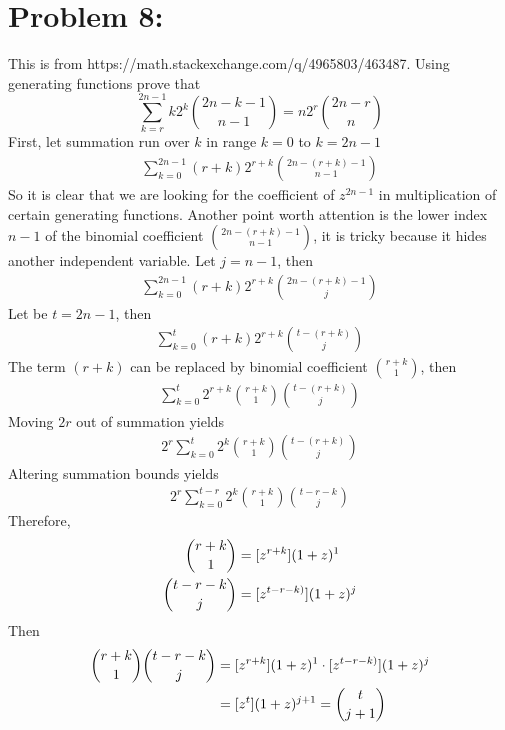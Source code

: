﻿\section{Problem 8: }
\label{sec:problem-8}
This is from https://math.stackexchange.com/q/4965803/463487.
Using generating functions prove that
\begin{equation*}
    \sum_{k=r}^{2n-1} k2^k \binom{2n-k-1}{n-1} = n2^r \binom{2n-r}{n}
\end{equation*}
First, let summation run over $k$ in range $k=0$ to $k=2n-1$
\begin{align*}
    \sum_{k=0}^{2n-1} (r+k) 2^{r+k} \binom{2n-(r+k)-1}{n-1}
\end{align*}
So it is clear that we are looking for the coefficient of $z^{2n-1}$ in multiplication of certain generating functions.
Another point worth attention is the lower index $n-1$ of the binomial coefficient $\binom{2n-(r+k)-1}{n-1}$,
it is tricky because it hides another independent variable.
Let $j=n-1$, then
\begin{align*}
    \sum_{k=0}^{2n-1} (r+k) 2^{r+k} \binom{2n-(r+k)-1}{j}
\end{align*}
Let be $t=2n-1$, then
\begin{align*}
    \sum_{k=0}^{t} (r+k) 2^{r+k} \binom{t-(r+k)}{j}
\end{align*}
The term $(r+k)$ can be replaced by binomial coefficient $\binom{r+k}{1}$, then
\begin{align*}
    \sum_{k=0}^{t} 2^{r+k} \binom{r+k}{1} \binom{t-(r+k)}{j}
\end{align*}
Moving $2r$ out of summation yields
\begin{align*}
    2^r \sum_{k=0}^{t} 2^{k} \binom{r+k}{1} \binom{t-(r+k)}{j}
\end{align*}
Altering summation bounds yields
\begin{align*}
    2^r \sum_{k=0}^{t-r} 2^{k} \binom{r+k}{1} \binom{t-r-k}{j}
\end{align*}
Therefore,
\begin{align*}
    \binom{r+k}{1} &= [z^{r+k}] (1+z)^1 \\
    \binom{t-r-k}{j} &= [z^{t-r-k)}] (1+z)^j
\end{align*}
Then
\begin{align*}
    \binom{r+k}{1} \binom{t-r-k}{j} &= [z^{r+k}] (1+z)^1  \cdot [z^{t-r-k)}] (1+z)^j \\
    &= [z^{t}] (1+z)^{j+1} = \binom{t}{j+1}
\end{align*}
